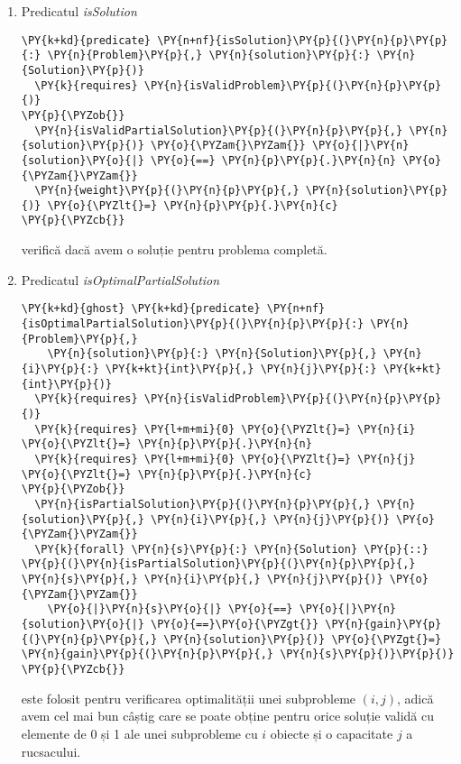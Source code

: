 \begin{enumerate}
    \item Predicatul \textit{isSolution}
    \begin{Verbatim}[commandchars=\\\{\}]
\PY{k+kd}{predicate} \PY{n+nf}{isSolution}\PY{p}{(}\PY{n}{p}\PY{p}{:} \PY{n}{Problem}\PY{p}{,} \PY{n}{solution}\PY{p}{:} \PY{n}{Solution}\PY{p}{)}
  \PY{k}{requires} \PY{n}{isValidProblem}\PY{p}{(}\PY{n}{p}\PY{p}{)}
\PY{p}{\PYZob{}}
  \PY{n}{isValidPartialSolution}\PY{p}{(}\PY{n}{p}\PY{p}{,} \PY{n}{solution}\PY{p}{)} \PY{o}{\PYZam{}\PYZam{}} \PY{o}{|}\PY{n}{solution}\PY{o}{|} \PY{o}{==} \PY{n}{p}\PY{p}{.}\PY{n}{n} \PY{o}{\PYZam{}\PYZam{}}
  \PY{n}{weight}\PY{p}{(}\PY{n}{p}\PY{p}{,} \PY{n}{solution}\PY{p}{)} \PY{o}{\PYZlt{}=} \PY{n}{p}\PY{p}{.}\PY{n}{c}
\PY{p}{\PYZcb{}}
\end{Verbatim} 
    verifică dacă avem o soluție pentru problema completă.
    \item Predicatul \textit{isOptimalPartialSolution}
    \begin{Verbatim}[commandchars=\\\{\}]
\PY{k+kd}{ghost} \PY{k+kd}{predicate} \PY{n+nf}{isOptimalPartialSolution}\PY{p}{(}\PY{n}{p}\PY{p}{:} \PY{n}{Problem}\PY{p}{,} 
    \PY{n}{solution}\PY{p}{:} \PY{n}{Solution}\PY{p}{,} \PY{n}{i}\PY{p}{:} \PY{k+kt}{int}\PY{p}{,} \PY{n}{j}\PY{p}{:} \PY{k+kt}{int}\PY{p}{)}
  \PY{k}{requires} \PY{n}{isValidProblem}\PY{p}{(}\PY{n}{p}\PY{p}{)}
  \PY{k}{requires} \PY{l+m+mi}{0} \PY{o}{\PYZlt{}=} \PY{n}{i} \PY{o}{\PYZlt{}=} \PY{n}{p}\PY{p}{.}\PY{n}{n}
  \PY{k}{requires} \PY{l+m+mi}{0} \PY{o}{\PYZlt{}=} \PY{n}{j} \PY{o}{\PYZlt{}=} \PY{n}{p}\PY{p}{.}\PY{n}{c}
\PY{p}{\PYZob{}}
  \PY{n}{isPartialSolution}\PY{p}{(}\PY{n}{p}\PY{p}{,} \PY{n}{solution}\PY{p}{,} \PY{n}{i}\PY{p}{,} \PY{n}{j}\PY{p}{)} \PY{o}{\PYZam{}\PYZam{}}
  \PY{k}{forall} \PY{n}{s}\PY{p}{:} \PY{n}{Solution} \PY{p}{::} \PY{p}{(}\PY{n}{isPartialSolution}\PY{p}{(}\PY{n}{p}\PY{p}{,} \PY{n}{s}\PY{p}{,} \PY{n}{i}\PY{p}{,} \PY{n}{j}\PY{p}{)} \PY{o}{\PYZam{}\PYZam{}} 
    \PY{o}{|}\PY{n}{s}\PY{o}{|} \PY{o}{==} \PY{o}{|}\PY{n}{solution}\PY{o}{|} \PY{o}{==}\PY{o}{\PYZgt{}} \PY{n}{gain}\PY{p}{(}\PY{n}{p}\PY{p}{,} \PY{n}{solution}\PY{p}{)} \PY{o}{\PYZgt{}=} \PY{n}{gain}\PY{p}{(}\PY{n}{p}\PY{p}{,} \PY{n}{s}\PY{p}{)}\PY{p}{)}
\PY{p}{\PYZcb{}}
\end{Verbatim}
    este folosit pentru verificarea optimalității unei subprobleme $(i, j)$, adică avem cel mai bun câștig care se poate obține pentru orice soluție validă cu elemente de 0 și 1 ale unei subprobleme cu $i$ obiecte și o capacitate $j$ a rucsacului.

\end{enumerate}
